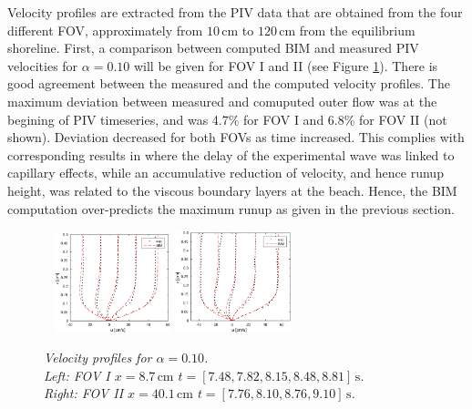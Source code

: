\documentclass[review, authoryear]{elsarticle}
\newcommand{\s}{\,\mbox{s}}
\newcommand{\cm}{\,\mbox{cm}}
\begin{document}
Velocity profiles are extracted from the PIV data that are obtained from the four different FOV, approximately from $10\cm$ to $120\cm$ from the equilibrium shoreline. 
First, a comparison between computed BIM and measured PIV velocities for $\alpha=0.10$ will be given for FOV I and II (see Figure \ref{fig:BIM3_tim}). There is good agreement between the measured and the computed velocity profiles. The maximum deviation between measured and comuputed outer flow was at the begining of PIV timeseries, and was 4.7\% for FOV I and 6.8\% for FOV II (not shown). Deviation decreased for both FOVs as time increased.  This complies with corresponding results in \cite{pedersen2013runup} where the
delay of the experimental wave was linked to capillary effects, while
an accumulative reduction of velocity, and hence runup height, was
related to the viscous boundary layers at the beach.  Hence, the BIM 
computation over-predicts the maximum runup as given in the previous section.

\begin{figure}
        \centering
        ~ %
                \includegraphics[width=0.3\textwidth]{./Figures/BIM/case10_BIM_PIV_FOV3.eps}
                \includegraphics[width=0.3\textwidth]{./Figures/BIM/case10_BIM_PIV_FOV4.eps}
                \caption{\textit{ Velocity profiles for $\alpha=0.10$.\\ Left: FOV I $x=8.7\cm$ $t=[7.48, 7.82, 8.15, 8.48, 8.81]\s$.\\
                 \quad Right: FOV II $x=40.1\cm$ $t=[7.76, 8.10, 8.76, 9.10]\s$.}}
              \label{fig:BIM3_tim}
      \end{figure}
      
\end{document}

